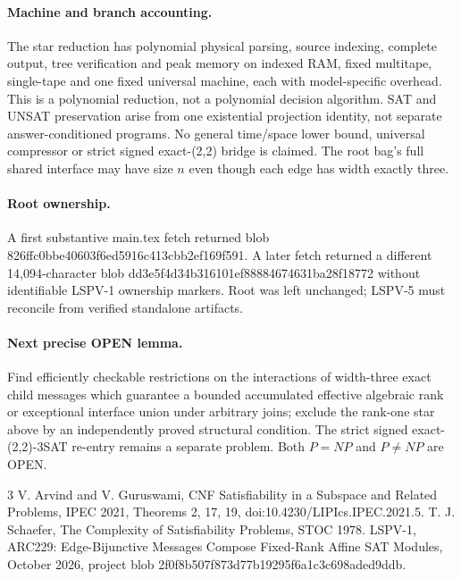 \documentclass[11pt]{article}
\begin{document}
\paragraph{Machine and branch accounting.}
The star reduction has polynomial physical parsing, source indexing, complete output, tree verification and peak memory on indexed RAM, fixed multitape, single-tape and one fixed universal machine, each with model-specific overhead. This is a polynomial reduction, not a polynomial decision algorithm. SAT and UNSAT preservation arise from one existential projection identity, not separate answer-conditioned programs. No general time/space lower bound, universal compressor or strict signed exact-(2,2) bridge is claimed. The root bag's full shared interface may have size $n$ even though each edge has width exactly three.
\paragraph{Root ownership.}
A first substantive main.tex fetch returned blob 826ffc0bbe40603f6ed5916c413cbb2ef169f591. A later fetch returned a different 14,094-character blob dd3e5f4d34b316101ef88884674631ba28f18772 without identifiable LSPV-1 ownership markers. Root was left unchanged; LSPV-5 must reconcile from verified standalone artifacts.
\paragraph{Next precise OPEN lemma.}
Find efficiently checkable restrictions on the interactions of width-three exact child messages which guarantee a bounded accumulated effective algebraic rank or exceptional interface union under arbitrary joins; exclude the rank-one star above by an independently proved structural condition. The strict signed exact-(2,2)-3SAT re-entry remains a separate problem. Both $P=NP$ and $P\ne NP$ are OPEN.
\begin{thebibliography}{3}
 V. Arvind and V. Guruswami, CNF Satisfiability in a Subspace and Related Problems, IPEC 2021, Theorems 2, 17, 19, doi:10.4230/LIPIcs.IPEC.2021.5.
 T. J. Schaefer, The Complexity of Satisfiability Problems, STOC 1978.
 LSPV-1, ARC229: Edge-Bijunctive Messages Compose Fixed-Rank Affine SAT Modules, October 2026, project blob 2f0f8b507f873d77b19295f6a1c3c698aded9ddb.
\end{thebibliography}
\end{document}

